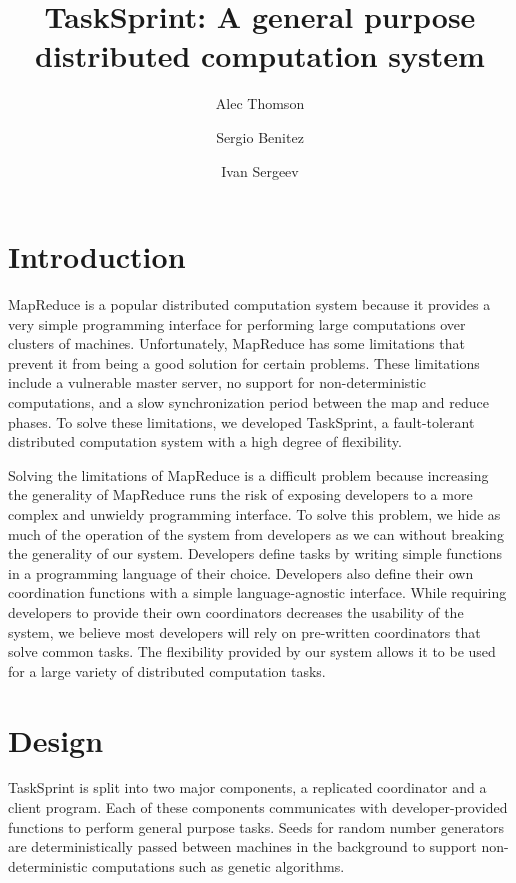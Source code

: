 \documentclass [11pt, twocolumn] {article}
\begin{document}
 

\title { TaskSprint: A general purpose distributed computation system }
\author{ Alec Thomson \and Sergio Benitez \and Ivan Sergeev }
\date {}

\maketitle


\section {Introduction} 

MapReduce is a popular distributed computation system because it provides a very simple programming interface for performing large computations over clusters of machines. Unfortunately, MapReduce has some limitations that prevent it from being a good solution for certain problems. These limitations include a vulnerable master server, no support for non-deterministic computations, and a slow synchronization period between the map and reduce phases. To solve these limitations, we developed TaskSprint, a fault-tolerant distributed computation system with a high degree of flexibility.  

Solving the limitations of MapReduce is a difficult problem because increasing the generality of MapReduce runs the risk of exposing developers to a more complex and unwieldy programming interface. To solve this problem, we hide as much of the operation of the system from developers as we can without breaking the generality of our system. Developers define tasks by writing simple functions in a programming language of their choice. Developers also define their own coordination functions with a simple language-agnostic interface. While requiring developers to provide their own coordinators decreases the usability of the system, we believe most developers will rely on pre-written coordinators that solve common tasks. The flexibility provided by our system allows it to be used for a large variety of distributed computation tasks. 

\section {Design}

TaskSprint is split into two major components, a replicated coordinator and a client program. Each of these components communicates with developer-provided functions to perform general purpose tasks. Seeds for random number generators are deterministically passed between machines in the background to support non-deterministic computations such as genetic algorithms. 
\end{document}
